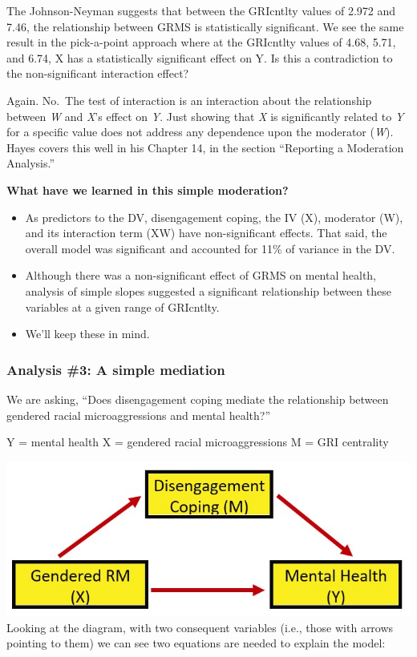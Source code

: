 \documentclass[
  11pt,
]{book}
\providecommand{\tightlist}{%
  \setlength{\itemsep}{0pt}\setlength{\parskip}{0pt}}
\begin{document}
The Johnson-Neyman suggests that between the GRIcntlty values of 2.972 and 7.46, the relationship between GRMS is statistically significant. We see the same result in the pick-a-point approach where at the GRIcntlty values of 4.68, 5.71, and 6.74, X has a statistically significant effect on Y. Is this a contradiction to the non-significant interaction effect?

Again. No.~The test of interaction is an interaction about the relationship between \emph{W} and \emph{X}'s effect on \emph{Y}. Just showing that \emph{X} is significantly related to \emph{Y} for a specific value does not address any dependence upon the moderator (\emph{W}). Hayes \citeyearpar{hayes_introduction_2018} covers this well in his Chapter 14, in the section ``Reporting a Moderation Analysis.''

\textbf{What have we learned in this simple moderation?}

\begin{itemize}
\tightlist
\item
  As predictors to the DV, disengagement coping, the IV (X), moderator (W), and its interaction term (XW) have non-significant effects. That said, the overall model was significant and accounted for 11\% of variance in the DV.
\item
  Although there was a non-significant effect of GRMS on mental health, analysis of simple slopes suggested a significant relationship between these variables at a given range of GRIcntlty.
\item
  We'll keep these in mind.
\end{itemize}

\hypertarget{analysis-3-a-simple-mediation}{%
\subsubsection{Analysis \#3: A simple mediation}\label{analysis-3-a-simple-mediation}}

We are asking, ``Does disengagement coping mediate the relationship between gendered racial microaggressions and mental health?''

Y = mental health
X = gendered racial microaggressions
M = GRI centrality

\includegraphics{images/ModMed/LewisMed.jpg}
Looking at the diagram, with two consequent variables (i.e., those with arrows pointing to them) we can see two equations are needed to explain the model:
\end{document}
